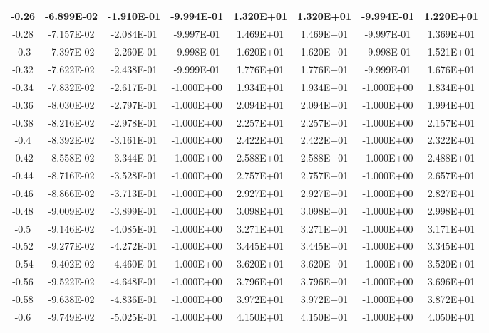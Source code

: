 \documentclass{article}
\begin{document}
\begin{center}
\begin{longtable}{|c|c|c|c|c|c|c|c|}
        -0.26 & -6.899E-02 & -1.910E-01 & -9.994E-01 & 1.320E+01 & 1.320E+01 & -9.994E-01 & 1.220E+01 \\ \hline
        -0.28 & -7.157E-02 & -2.084E-01 & -9.997E-01 & 1.469E+01 & 1.469E+01 & -9.997E-01 & 1.369E+01 \\ \hline
        -0.3 & -7.397E-02 & -2.260E-01 & -9.998E-01 & 1.620E+01 & 1.620E+01 & -9.998E-01 & 1.521E+01 \\ \hline
        -0.32 & -7.622E-02 & -2.438E-01 & -9.999E-01 & 1.776E+01 & 1.776E+01 & -9.999E-01 & 1.676E+01 \\ \hline
        -0.34 & -7.832E-02 & -2.617E-01 & -1.000E+00 & 1.934E+01 & 1.934E+01 & -1.000E+00 & 1.834E+01 \\ \hline
        -0.36 & -8.030E-02 & -2.797E-01 & -1.000E+00 & 2.094E+01 & 2.094E+01 & -1.000E+00 & 1.994E+01 \\ \hline
        -0.38 & -8.216E-02 & -2.978E-01 & -1.000E+00 & 2.257E+01 & 2.257E+01 & -1.000E+00 & 2.157E+01 \\ \hline
        -0.4 & -8.392E-02 & -3.161E-01 & -1.000E+00 & 2.422E+01 & 2.422E+01 & -1.000E+00 & 2.322E+01 \\ \hline
        -0.42 & -8.558E-02 & -3.344E-01 & -1.000E+00 & 2.588E+01 & 2.588E+01 & -1.000E+00 & 2.488E+01 \\ \hline
        -0.44 & -8.716E-02 & -3.528E-01 & -1.000E+00 & 2.757E+01 & 2.757E+01 & -1.000E+00 & 2.657E+01 \\ \hline
        -0.46 & -8.866E-02 & -3.713E-01 & -1.000E+00 & 2.927E+01 & 2.927E+01 & -1.000E+00 & 2.827E+01 \\ \hline
        -0.48 & -9.009E-02 & -3.899E-01 & -1.000E+00 & 3.098E+01 & 3.098E+01 & -1.000E+00 & 2.998E+01 \\ \hline
        -0.5 & -9.146E-02 & -4.085E-01 & -1.000E+00 & 3.271E+01 & 3.271E+01 & -1.000E+00 & 3.171E+01 \\ \hline
        -0.52 & -9.277E-02 & -4.272E-01 & -1.000E+00 & 3.445E+01 & 3.445E+01 & -1.000E+00 & 3.345E+01 \\ \hline
        -0.54 & -9.402E-02 & -4.460E-01 & -1.000E+00 & 3.620E+01 & 3.620E+01 & -1.000E+00 & 3.520E+01 \\ \hline
        -0.56 & -9.522E-02 & -4.648E-01 & -1.000E+00 & 3.796E+01 & 3.796E+01 & -1.000E+00 & 3.696E+01 \\ \hline
        -0.58 & -9.638E-02 & -4.836E-01 & -1.000E+00 & 3.972E+01 & 3.972E+01 & -1.000E+00 & 3.872E+01 \\ \hline
        -0.6 & -9.749E-02 & -5.025E-01 & -1.000E+00 & 4.150E+01 & 4.150E+01 & -1.000E+00 & 4.050E+01 \\ \hline

\end{longtable}
\end{center}
\end{document}

